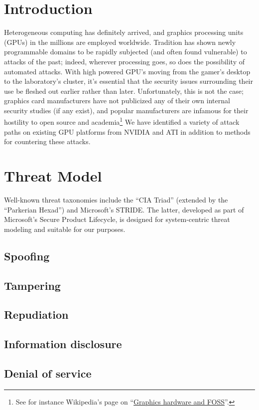 \documentclass[letterpaper,10pt]{article}
\begin{document}
\begin{multicols}{2}
\section{Introduction}
Heterogeneous computing has definitely arrived, and graphics processing units (GPUs) in the millions are employed worldwide. Tradition has shown newly programmable domains to be rapidly subjected (and often found vulnerable) to attacks of the past; indeed, wherever processing goes, so does the possibility of automated attacks. With high powered GPU's moving from the gamer's desktop to the laboratory's cluster, it's essential that the security issues surrounding their use be fleshed out earlier rather than later. Unfortunately, this is not the case; graphics card manufacturers have not publicized any of their own internal security studies (if any exist), and popular manufacturers are infamous for their
hostility to open source and academia\footnote{See for instance Wikipedia's page on
``\href{http://en.wikipedia.org/wiki/NVIDIA\_and\_FOSS}{Graphics hardware and FOSS}''.}
We have identified a variety of attack paths on existing GPU platforms from NVIDIA and ATI in addition to methods for countering these attacks.

\section{Threat Model}
Well-known threat taxonomies include the ``CIA Triad'' (extended by the
``Parkerian Hexad\cite{sechandbook}'') and Microsoft's STRIDE. The latter, developed as part of
Microsoft's Secure Product Lifecycle, is designed for system-centric threat
modeling and suitable for our purposes.
\subsection{Spoofing}
\subsection{Tampering}
\subsection{Repudiation}
\subsection{Information disclosure}
\subsection{Denial of service}

\end{multicols}
\end{document}
